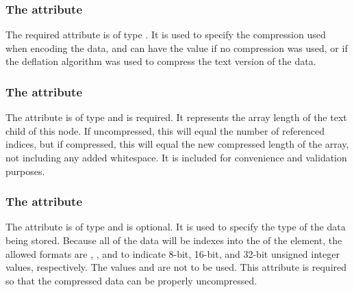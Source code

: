 \subsubsection{The \fixttspace{} attribute}
The required  attribute is of type . It is used to specify the compression used when encoding the data, and can have the value  if no compression was used, or  if the deflation algorithm was used to compress the text version of the data.


\subsubsection{The \fixttspace{} attribute}
The  attribute is of type  and is required. It represents the array length of the  text child of this node.  If uncompressed, this will equal the number of referenced indices, but if compressed, this will equal the new compressed length of the array, not including any added whitespace.  It is included for convenience and validation purposes.

\subsubsection{The \fixttspace{} attribute}
The  attribute is of type  and is optional.  It is used to specify the type of the data being stored.  Because all of the data will be indexes into the  of the \SpatialPoints element, the allowed formats are , , and  to indicate 8-bit, 16-bit, and 32-bit unsigned integer values, respectively.  The values  and  are not to be used.  This attribute is required so that the compressed data can be properly uncompressed.


